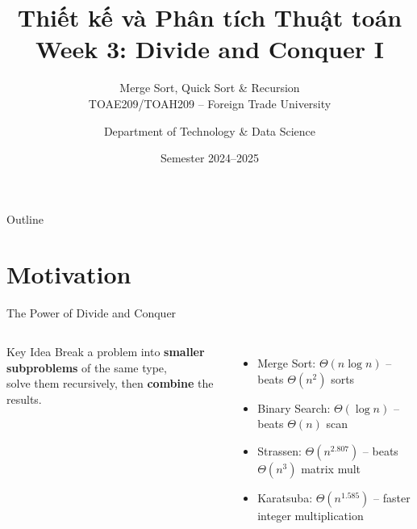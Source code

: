 \documentclass[aspectratio=169,xcolor=dvipsnames]{beamer}
\title[Algorithms -- Week 3]{\textbf{Thiết kế và Phân tích Thuật toán}\\
  \large Week 3: Divide and Conquer I}
\subtitle{Merge Sort, Quick Sort & Recursion \\ TOAE209/TOAH209 -- Foreign Trade University}
\author{Department of Technology \& Data Science}
\date{Semester 2024--2025}
\begin{document}
\begin{frame}\titlepage\end{frame}
\begin{frame}{Outline}\tableofcontents\end{frame}

\section{Motivation}
\begin{frame}{The Power of Divide and Conquer}
  \begin{columns}
    \begin{block}{Key Idea}
      Break a problem into \textbf{smaller subproblems} of the same type,\\
      solve them recursively, then \textbf{combine} the results.
    \end{block}
    \begin{itemize}
      \item Merge Sort: $\Theta(n\log n)$ -- beats $\Theta(n^2)$ sorts
      \item Binary Search: $\Theta(\log n)$ -- beats $\Theta(n)$ scan
      \item Strassen: $\Theta(n^{2.807})$ -- beats $\Theta(n^3)$ matrix mult
      \item Karatsuba: $\Theta(n^{1.585})$ -- faster integer multiplication
    \end{itemize}
  \end{columns}
\end{frame}
\end{document}

